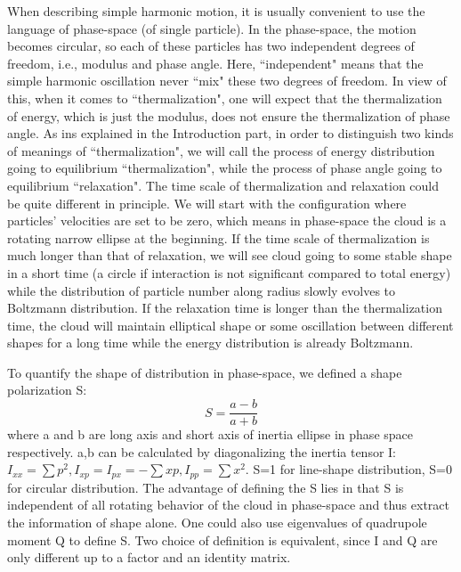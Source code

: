 \documentclass[onecolumn,pra]{revtex4-1}
\begin{document}
When describing simple harmonic motion, it is usually convenient to use the language of phase-space
(of single particle). In the phase-space, the motion becomes circular, so each of these particles
has two independent degrees of freedom, i.e., modulus and phase angle. Here, ``independent" means
that the simple harmonic oscillation never ``mix" these two degrees of freedom. In view of this,
when it comes to ``thermalization", one will expect that the thermalization of energy, which is just
the modulus, does not ensure the thermalization of phase angle. As ins explained in the Introduction
part, in order to distinguish two kinds of meanings of ``thermalization", we will call the process
of energy distribution going to equilibrium ``thermalization", while the process of phase angle
going to equilibrium ``relaxation". The time scale of thermalization and relaxation could be quite
different in principle. We will start with the configuration where particles' velocities are set to
be zero, which means in phase-space the cloud is a rotating narrow ellipse at the beginning. If the
time scale of thermalization is much longer than that of relaxation, we will see cloud going to some
stable shape in a short time (a circle if interaction is not significant compared to total energy)
while the distribution of particle number along radius slowly evolves to Boltzmann distribution. If
the relaxation time is longer than the thermalization time, the cloud will maintain elliptical shape
or some oscillation between different shapes for a long time while the energy distribution is
already Boltzmann.

To quantify the shape of distribution in phase-space, we defined a shape polarization S:
\begin{equation}
S=\frac{a-b}{a+b}
\end{equation}
where a and b are long axis and short axis of inertia ellipse in phase space respectively. a,b can
be calculated by diagonalizing the inertia tensor I: $I_{xx}=\sum{p^2},
I_{xp}=I_{px}=-\sum{xp},I_{pp}=\sum{x^2}$. S=1 for line-shape distribution, S=0 for circular
distribution. The advantage of defining the S lies in that S is independent of all rotating behavior
of the cloud in phase-space and thus extract the information of shape alone. One could also use
eigenvalues of quadrupole moment Q to define S. Two choice of definition is equivalent, since I and
Q are only different up to a factor and an identity matrix.



\end{document}
